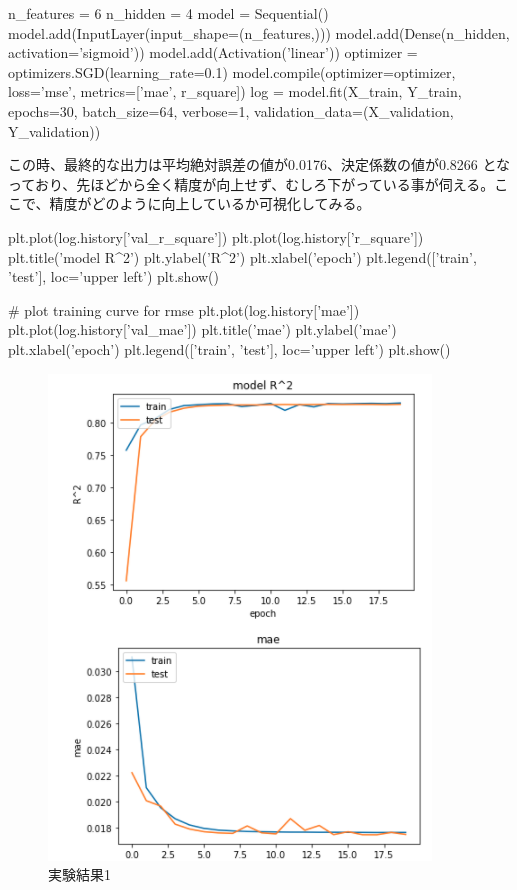 \documentclass{article}
\begin{document}
\begin{python}
n_features = 6
n_hidden   = 4
model = Sequential()
model.add(InputLayer(input_shape=(n_features,)))
model.add(Dense(n_hidden, activation='sigmoid'))
model.add(Activation('linear'))
optimizer = optimizers.SGD(learning_rate=0.1)
model.compile(optimizer=optimizer,
              loss='mse', metrics=['mae', r_square])
log = model.fit(X_train, Y_train, epochs=30, batch_size=64, 
verbose=1,
         validation_data=(X_validation, Y_validation))
\end{python}

この時、最終的な出力は平均絶対誤差の値が0.0176、決定係数の値が0.8266 となっており、先ほどから全く精度が向上せず、むしろ下がっている事が伺える。ここで、精度がどのように向上しているか可視化してみる。
\\

\begin{python}
plt.plot(log.history['val_r_square'])
plt.plot(log.history['r_square'])
plt.title('model R^2')
plt.ylabel('R^2')
plt.xlabel('epoch')
plt.legend(['train', 'test'], loc='upper left')
plt.show()

# plot training curve for rmse
plt.plot(log.history['mae'])
plt.plot(log.history['val_mae'])
plt.title('mae')
plt.ylabel('mae')
plt.xlabel('epoch')
plt.legend(['train', 'test'], loc='upper left')
plt.show()
\end{python}


\begin{figure}[H]
\begin{center}
\includegraphics[width=\linewidth]{experiment1.png}
\caption{実験結果1}
\end{center}
\end{figure}
\end{document}
